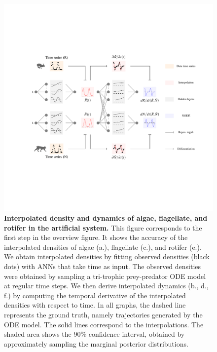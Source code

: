 \documentclass[11pt, oneside]{article}
\begin{document}
\newpage
\begin{figure}[H]
\begin{center}
\includegraphics[width=\linewidth,page=2]{figures/main.pdf}
\caption{
    \textbf{Interpolated density and dynamics of algae, flagellate, and rotifer in the artificial system.}
    This figure corresponds to the first step in the overview figure.
    It shows the accuracy of the interpolated densities of algae (a.), flagellate (c.), and rotifer (e.).
    We obtain interpolated densities by fitting observed densities (black dots) with ANNs that take time as input.
    The observed densities were obtained by sampling a tri-trophic prey-predator ODE model at regular time steps.
    We then derive interpolated dynamics (b., d., f.) by computing the temporal derivative of the interpolated densities with respect to time.
    In all graphs, the dashed line represents the ground truth, namely trajectories generated by the ODE model.
    The solid lines correspond to the interpolations. 
    The shaded area shows the 90\% confidence interval, obtained by approximately sampling the marginal posterior distributions. 
}
\end{center}
\end{figure}
\newpage
\end{document}
